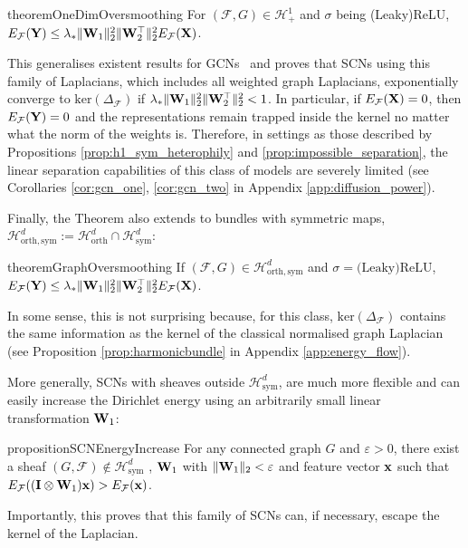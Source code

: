\documentclass{article}
\def\vx{{\bf{x}}}
\def\mI{{\bf{I}}}
\def\mW{{\bf{W}}}
\def\mX{{\bf{X}}}
\def\mY{{\bf{Y}}}
\def\gF{{\mathcal{F}}}
\def\gH{{\mathcal{H}}}
\DeclarePairedDelimiter{\norm}{\lVert}{\rVert}
\begin{document}
\begin{restatable}{theorem}{OneDimOversmoothing}\label{theo:1dim_oversmoothing}
For $(\gF, G) \in \gH^1_+$ and $\sigma$ being (Leaky)ReLU, $E_\gF(\mY) \leq\lambda_* \norm{\mW_1}_2^2 \norm{\mW_2^\top}_2^2 E_\gF(\mX)$.
\end{restatable}

This generalises existent results for GCNs~\citep{cai2020note, oono2019graph} and proves that SCNs using this family of Laplacians, which includes all weighted graph Laplacians, exponentially converge to $\mathrm{ker}(\Delta_\gF)$ if $\lambda_* \norm{\mW_1}_2^2 \norm{\mW_2^\top}_2^2 < 1$. In particular, if $E_\gF(\mX) = 0$, then $E_\gF(\mY) = 0$ and the representations remain trapped inside the kernel no matter what the norm of the weights is. Therefore, in settings as those described by Propositions \ref{prop:h1_sym_heterophily} and \ref{prop:impossible_separation}, the linear separation capabilities of this class of models are severely limited (see Corollaries \ref{cor:gcn_one}, \ref{cor:gcn_two} in Appendix \ref{app:diffusion_power}). 

Finally, the Theorem also extends to bundles with symmetric maps, $\gH^d_\mathrm{orth, sym} := \gH^d_\mathrm{orth} \cap \gH^d_\mathrm{sym}$:
\begin{restatable}{theorem}{GraphOversmoothing}\label{theo:graph_oversmoothing}
If $(\gF, G) \in \gH^d_\mathrm{orth, sym}$ and $\sigma= \text{(Leaky)ReLU}$, $E_\gF(\mY) \leq \lambda_* \norm{\mW_1}_2^2 \norm{\mW_2^\top}_2^2 E_\gF(\mX)$. 
\end{restatable}
In some sense, this is not surprising because, for this class, $\mathrm{ker}(\Delta_\gF)$ contains the same information as the kernel of the classical normalised graph Laplacian (see Proposition \ref{prop:harmonicbundle} in Appendix \ref{app:energy_flow}). 

More generally, SCNs with sheaves outside $\gH^d_\mathrm{sym}$, are much more flexible and can easily increase the Dirichlet energy using an arbitrarily small linear transformation $\mW_1$:
\begin{restatable}{proposition}{SCNEnergyIncrease}\label{prop:scn_energy_increase}
For any connected graph $G$ and $\varepsilon > 0$, there exist a sheaf $(G, \gF) \notin \gH^d_\mathrm{sym}$ , $\mW_1$ with $\norm{\mW_1}_2 < \varepsilon$ and feature vector $\vx$ such that $E_\gF((\mI\otimes \mW_1) \vx) > E_\gF(\vx)$.
\end{restatable}
Importantly, this proves that this family of SCNs can, if necessary, escape the kernel of the Laplacian.
\end{document}
